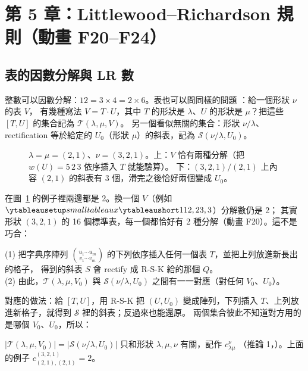 
\section{第 5 章：Littlewood–Richardson 規則（動畫 F20--F24）}\label{sec:f-ch5}

\subsection{表的因數分解與 LR 數}\label{sec:f-factor}

整數可以因數分解：$12=3\times4=2\times6$。表也可以問同樣的問題 ：給一個形狀 $\nu$ 的表 $V$，
有幾種寫法 $V=T\cdot U$，其中 $T$ 的形狀是 $\lambda$、$U$ 的形狀是 $\mu$？把這些 $[T,U]$ 的集合記為 $\mathcal T(\lambda,\mu,V)$。
另一個看似無關的集合：形狀 $\nu/\lambda$、rectification 等於給定的 $U_0$（形狀 $\mu$）的斜表，記為 $\mathcal S(\nu/\lambda,U_0)$。

\begin{figure}[H]
\centering
\FulFactor
\caption{$\lambda=\mu=(2,1)$、$\nu=(3,2,1)$。上：$V$ 恰有兩種分解（把 $w(U)=5\,2\,3$ 依序插入 $T$ 就能驗算）。
下：$(3,2,1)/(2,1)$ 上內容 $(2,1)$ 的斜表有 3 個，滑完之後恰好兩個變成 $U_0$。}
\label{fig:f-factor}
\end{figure}

在圖~\ref{fig:f-factor} 的例子裡兩邊都是 2。換一個 $V$（例如 $\yts{112,23,3}$）分解數仍是 2；
其實形狀 $(3,2,1)$ 的 16 個標準表，每一個都恰好有 2 種分解（動畫 F20）。這不是巧合：

\begin{thmbox}[命題 1、2 \fulref{p.58--62}]
(1) 把字典序陣列 $\binom{u_1\cdots u_m}{v_1\cdots v_m}$ 的下列依序插入任何一個表 $T$，並把上列放進新長出的格子，
得到的斜表 $S$ 會 rectify 成 R-S-K 給的那個 $Q$。\\
(2) 由此，$\mathcal T(\lambda,\mu,V_0)$ 與 $\mathcal S(\nu/\lambda,U_0)$ 之間有一一對應（對任何 $V_0$、$U_0$）。
\end{thmbox}

對應的做法：給 $[T,U]$，用 R-S-K 把 $(U,U_0)$ 變成陣列，下列插入 $T$、上列放進新格子，就得到 $\mathcal S$ 裡的斜表；反過來也能還原。
兩個集合彼此不知道對方用的是哪個 $V_0$、$U_0$，所以：

\begin{keybox}
$|\mathcal T(\lambda,\mu,V_0)|=|\mathcal S(\nu/\lambda,U_0)|$ 只和形狀 $\lambda,\mu,\nu$ 有關，記作 $c^\nu_{\lambda\mu}$
（推論 1，）。上面的例子 $c^{(3,2,1)}_{(2,1),(2,1)}=2$。
\end{keybox}


